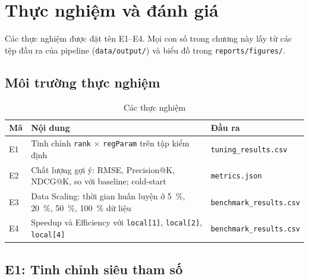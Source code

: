\chapter{Thực nghiệm và đánh giá}
\label{chap:danh_gia}

Các thực nghiệm được đặt tên E1--E4. Mọi con số trong chương này lấy từ các tệp đầu ra của pipeline (\texttt{data/output/}) và biểu đồ trong \texttt{reports/figures/}.

\section{Môi trường thực nghiệm}
\label{sec:moi_truong}

\begin{table}[H]
\centering
\caption{Các thực nghiệm}
\label{tab:experiments}
\begin{tabularx}{\textwidth}{l X l}
\toprule
\textbf{Mã} & \textbf{Nội dung} & \textbf{Đầu ra} \\
\midrule
E1 & Tinh chỉnh \texttt{rank} $\times$ \texttt{regParam} trên tập kiểm định & \texttt{tuning\_results.csv} \\
E2 & Chất lượng gợi ý: RMSE, Precision@K, NDCG@K, so với baseline; cold-start & \texttt{metrics.json} \\
E3 & Data Scaling: thời gian huấn luyện ở \SI{5}{\percent}, \SI{20}{\percent}, \SI{50}{\percent}, \SI{100}{\percent} dữ liệu & \texttt{benchmark\_results.csv} \\
E4 & Speedup và Efficiency với \texttt{local[1]}, \texttt{local[2]}, \texttt{local[4]} & \texttt{benchmark\_results.csv} \\
\bottomrule
\end{tabularx}
\end{table}

\section{E1: Tinh chỉnh siêu tham số}
\label{sec:e1}

